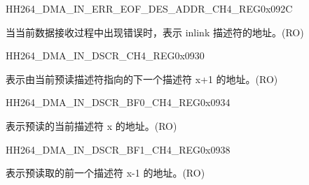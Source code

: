 \begin{register}{H}{H264\_DMA\_IN\_ERR\_EOF\_DES\_ADDR\_CH4\_REG}{0x092C}\label{regdesc:H264DMAINERREOFDESADDRCH4REG}
%
\regnewline%
\begin{regdesc}\begin{reglist}
\label{fielddesc:H264DMAINERREOFDESADDRCH4}\item [H264\_DMA\_IN\_ERR\_EOF\_DES\_ADDR\_CH4] 当当前数据接收过程中出现错误时，表示 inlink 描述符的地址。(RO)
\end{reglist}\end{regdesc}
\end{register}


\begin{register}{H}{H264\_DMA\_IN\_DSCR\_CH4\_REG}{0x0930}\label{regdesc:H264DMAINDSCRCH4REG}
%
\regnewline%
\begin{regdesc}\begin{reglist}
\label{fielddesc:H264DMAINLINKDSCRCH4}\item [H264\_DMA\_INLINK\_DSCR\_CH4] 表示由当前预读描述符指向的下一个描述符 x+1 的地址。(RO)
\end{reglist}\end{regdesc}
\end{register}


\begin{register}{H}{H264\_DMA\_IN\_DSCR\_BF0\_CH4\_REG}{0x0934}\label{regdesc:H264DMAINDSCRBF0CH4REG}
%
\regnewline%
\begin{regdesc}\begin{reglist}
\label{fielddesc:H264DMAINLINKDSCRBF0CH4}\item [H264\_DMA\_INLINK\_DSCR\_BF0\_CH4] 表示预读的当前描述符 x 的地址。(RO)
\end{reglist}\end{regdesc}
\end{register}


\begin{register}{H}{H264\_DMA\_IN\_DSCR\_BF1\_CH4\_REG}{0x0938}\label{regdesc:H264DMAINDSCRBF1CH4REG}
%
\regnewline%
\begin{regdesc}\begin{reglist}
\label{fielddesc:H264DMAINLINKDSCRBF1CH4}\item [H264\_DMA\_INLINK\_DSCR\_BF1\_CH4] 表示预读取的前一个描述符 x-1 的地址。(RO)
\end{reglist}\end{regdesc}
\end{register}

